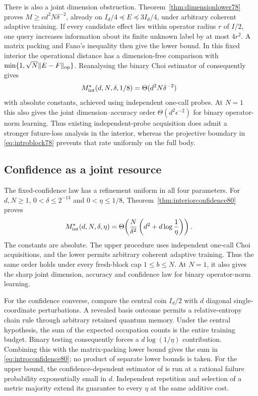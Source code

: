 There is also a joint dimension obstruction.
Theorem~\ref{thm:dimensionlower78} proves
$M\ge c d^2N\delta^{-2}$, already on
$I_d/4\preceq E\preceq3I_d/4$, under arbitrary coherent adaptive
training.  If every candidate effect lies within operator radius $r$
of $I/2$, one query increases information about its finite unknown
label by at most $4r^2$.  A matrix packing and Fano's inequality
then give the lower bound.
In this fixed interior the operational distance has a dimension-free
comparison with $\min\{1,\sqrt N\|E-F\|_{\rm op}\}$.
Reanalysing the binary Choi estimator of \cite{MB67} consequently gives
\begin{equation}\label{eq:introinterior78}
 M_{\rm int}^\star(d,N,\delta,1/8)
 =\Theta(d^2N\delta^{-2})
\end{equation}
with absolute constants, achieved using independent one-call probes.
At $N=1$ this also gives the joint dimension--accuracy order
$\Theta(d^2\epsilon^{-2})$ for binary operator-norm learning.
Thus existing independent-probe acquisition does admit a stronger
future-loss analysis in the interior, whereas the projective boundary
in \eqref{eq:introblock78} prevents that rate uniformly on the full body.

\subsection{Confidence as a joint resource}
The fixed-confidence law has a refinement uniform in all four
parameters.  For $d,N\ge1$, $0<\delta\le2^{-13}$ and
$0<\eta\le1/8$, Theorem~\ref{thm:interiorconfidence80} proves
\begin{equation}\label{eq:introconfidence80}
 M_{\rm int}^{\star}(d,N,\delta,\eta)
 =\Theta\!\left(\frac{N}{\delta^2}
                   \left(d^2+d\log\frac1\eta\right)\right).
\end{equation}
The constants are absolute.  The upper procedure uses independent
one-call Choi acquisitions, and the lower permits arbitrary coherent
adaptive training.  Thus the same order holds under every fresh-block
cap $1\le b\le N$.  At $N=1$, it also gives the sharp joint
dimension, accuracy and confidence law for binary operator-norm
learning.

For the confidence converse, compare the central coin $I_d/2$ with
$d$ diagonal single-coordinate perturbations.  A revealed basis
outcome permits a relative-entropy chain rule through arbitrary
retained quantum memory.  Under the central hypothesis, the sum of
the expected occupation counts is the entire training budget.
Binary testing consequently forces a $d\log(1/\eta)$ contribution.
Combining this with the matrix-packing lower bound gives the sum in
\eqref{eq:introconfidence80}; no product of separate lower bounds
is taken.  For the upper bound, the confidence-dependent estimator
of \cite[Corollary~III.9]{MB67} is run at a rational failure
probability exponentially small in $d$.  Independent repetition
and selection of a metric majority extend its guarantee to every
$\eta$ at the same additive cost.

